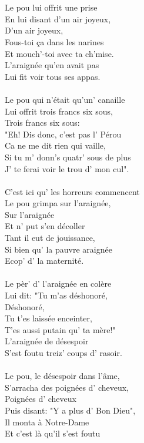 \\\\Le pou lui offrit une prise
\\En lui disant d'un air joyeux,
\\D'un air joyeux,
\\Fous-toi ça dans les narines
\\Et mouch'-toi avec ta ch'mise.
\\L'araignée qu'en avait pas
\\Lui fit voir tous ses appas.
\\\\Le pou qui n'était qu'un' canaille
\\Lui offrit trois francs six sous,
\\Trois francs six sous:
\\"Eh! Dis donc, c'est pas l' Pérou
\\Ca ne me dit rien qui vaille,
\\Si tu m' donn's quatr' sous de plus
\\J' te ferai voir le trou d' mon cul".
\\\\C'est ici qu' les horreurs commencent
\\Le pou grimpa sur l'araignée,
\\Sur l'araignée
\\Et n' put s'en décoller
\\Tant il eut de jouissance,
\\Si bien qu' la pauvre araignée
\\Ecop' d' la maternité.
\\\\Le pèr' d' l'araignée en colère
\\Lui dit: "Tu m'as déshonoré,
\\Déshonoré,
\\Tu t'es laissée enceinter,
\\T'es aussi putain qu' ta mère!"
\\L'araignée de désespoir
\\S'est foutu treiz' coups d' rasoir.
\\\\Le pou, le désespoir dans l'âme,
\\S'arracha des poignées d' cheveux,
\\Poignées d' cheveux
\\Puis disant: "Y a plus d' Bon Dieu",
\\Il monta à Notre-Dame
\\Et c'est là qu'il s'est foutu
